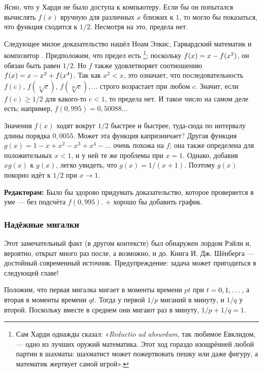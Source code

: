 Ясно, что у Харди не было доступа к компьютеру.
Если бы он попытался вычислять $f(x)$ вручную для различных $x$ близких к $1$, то могло бы показаться, что функция сходится к $1/2$.
Несмотря на это, предела нет.

Следующее милое доказательство нашёл Ноам Элкис, Гарвардский математик и композитор \cite[Problem 8]{elkies}.
Предположим, что предел есть%
\footnote{Сам Харди однажды сказал: «\emph{Reductio ad absurdum}, так любимое Евклидом, --- одно из лучших оружий математика.
Этот ход гораздо изощрённей любой партии в шахматы:
шахматист может пожертвовать пешку или даже фигуру, а математик жертвует самой игрой».};
поскольку $f(x)\z=x\z-f(x^2)$, он обязан быть равен $1/2$.
Но $f$ также удовлетворяет соотношению $f(x)\z=x\z-x^2\z+f(x^4)$.
Так как $x^2 < x$, это означает, что последовательность $f(c)$, $f(\sqrt[4]{c})$, $f(\sqrt[16]{c}),\dots$ строго возрастает при любом $c$.
Значит, если $f(c)\ge1/2$ для какого-то $c<1$, то предела нет.
И такое число на самом деле есть; например, $f(0{,}995)=0{,}50088\dots$

Значения $f(x)$ ходят вокруг $1/2$ быстрее и быстрее, туда-сюда по интервалу длины порядка $0{,}0055$. 
Может эта функция капризничает?
Другая функция $g(x)=1-x+x^2-x^3+x^4-\dots$ очень похожа на $f$;
она также определена для положительных $x < 1$, и у ней те же проблемы при $x = 1$.
Однако, добавив $xg(x)$ к $g(x)$, легко увидеть, что $g(x)=1/(x+1)$.
Поэтому $g(x)$ покорно идёт к $1/2$ при $x \to 1$.

\begin{addedbytheeditors}
\textbf{Редакторам:}
Было бы здорово придумать доказательство, которое проверяется в уме --- без подсчёта $f(0{,}995)$.
+ хорошо бы добавить график.
\end{addedbytheeditors}

\subsubsection*{Надёжные мигалки}

Этот замечательный факт (в другом контексте) был обнаружен лордом Рэйли и, вероятно, открыт много раз после, а возможно, и до.
Книга И. Дж. Шёнберга \cite{52} --- достойный современный источник.
Предупреждение: задача может пригодиться в следующей главе!

Положим, что первая мигалка мигает в моменты времени $pt$ при $t \z= 0, 1, \dots$, а вторая в моменты времени $qt$.
Тогда у первой $1/p$ миганий в минуту, и $1/q$ у второй.
Поскольку вместе в среднем они мигают раз в минуту,  $1/p + 1/q = 1$.

